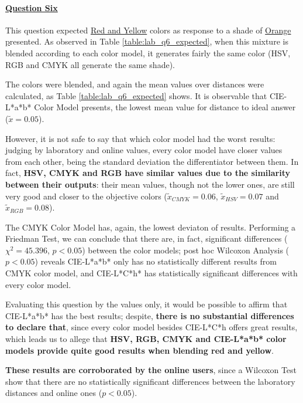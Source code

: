 \paragraph{\ul{Question Six}}
%
This question expected \ul{Red and Yellow} colors as response to a shade of \ul{Orange p}resented. As observed in Table \ref{table:lab_q6_expected}, when this mixture is blended according
to each color model, it generates fairly the same color (HSV, RGB and CMYK all generate the same shade). \par
%
The colors were blended, and again the mean values over distances were calculated, as Table \ref{table:lab_q6_expected} shows. It is observable that CIE-L*a*b* Color Model presents,
the lowest mean value for distance to ideal answer ($\tilde{x} = 0.05$). \par
%
However, it is not safe to say that which color model had the worst results: judging by laboratory and online values, every color model have closer values from each other, being the
standard deviation the differentiator between them. In fact, \textbf{HSV, CMYK and RGB have similar values due to the similarity between their outputs}: their mean values, though not
the lower ones, are still very good and closer to the objective colors ($\tilde{x}_{CMYK} = 0.06$, $\tilde{x}_{HSV} = 0.07$ and $\tilde{x}_{RGB} = 0.08$). \par
%
The CMYK Color Model has, again, the lowest deviaton of results. Performing a Friedman Test, we can conclude that there are, in fact, significant differences ($\chi^2 = 45.396$, $p < 0.05$)
between the color models; post hoc Wilcoxon Analysis ($p < 0.05$) reveals CIE-L*a*b* only has no statistically different results from CMYK color model, and CIE-L*C*h* has statistically
significant differences with every color model. \par
%
Evaluating this question by the values only, it would be possible to affirm that CIE-L*a*b* has the best results; despite, \textbf{there is no substantial differences to declare that}, since
every color model besides CIE-L*C*h offers great results, which leads us to allege that \textbf{HSV, RGB, CMYK and CIE-L*a*b* color models provide quite good results when blending red and yellow}. \par
%
\textbf{These results are corroborated by the online users}, since a Wilcoxon Test show that there are no statistically significant differences between the laboratory distances and online ones ($p < 0.05$).
%
